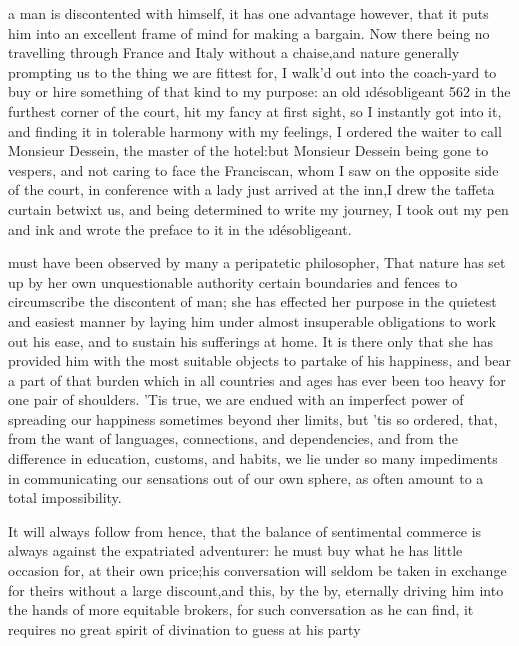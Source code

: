 \documentclass[twoside]{article}
\begin{document}


 a man is discontented with himself, it has one advantage however,
that it puts him into an excellent frame of mind for making a bargain.
Now there being no travelling through France and Italy without a
chaise,\tsk and nature generally prompting us to the thing we are fittest
for, I walk’d out into the coach-yard to buy or hire something of that
kind to my purpose: an old \i{désobligeant} {562} in the furthest corner of
the court, hit my fancy at first sight, so I instantly got into it, and
finding it in tolerable harmony with my feelings, I ordered the waiter to
call Monsieur Dessein, the master of the hotel:\tsk but Monsieur Dessein
being gone to vespers, and not caring to face the Franciscan, whom I saw
on the opposite side of the court, in conference with a lady just arrived
at the inn,\tsk I drew the taffeta curtain betwixt us, and being determined
to write my journey, I took out my pen and ink and wrote the preface to
it in the \i{désobligeant}.






 must have been observed by many a peripatetic philosopher, That nature
has set up by her own unquestionable authority certain boundaries and
fences to circumscribe the discontent of man; she has effected her
purpose in the quietest and easiest manner by laying him under almost
insuperable obligations to work out his ease, and to sustain his
sufferings at home.  It is there only that she has provided him with the
most suitable objects to partake of his happiness, and bear a part of
that burden which in all countries and ages has ever been too heavy for
one pair of shoulders.  ’Tis true, we are endued with an imperfect power
of spreading our happiness sometimes beyond \i{her} limits, but ’tis so
ordered, that, from the want of languages, connections, and dependencies,
and from the difference in education, customs, and habits, we lie under
so many impediments in communicating our sensations out of our own
sphere, as often amount to a total impossibility.

It will always follow from hence, that the balance of sentimental
commerce is always against the expatriated adventurer: he must buy what
he has little occasion for, at their own price;\tsk his conversation will
seldom be taken in exchange for theirs without a large discount,\tsk and
this, by the by, eternally driving him into the hands of more equitable
brokers, for such conversation as he can find, it requires no great
spirit of divination to guess at his party\tsk 
\end{document}
